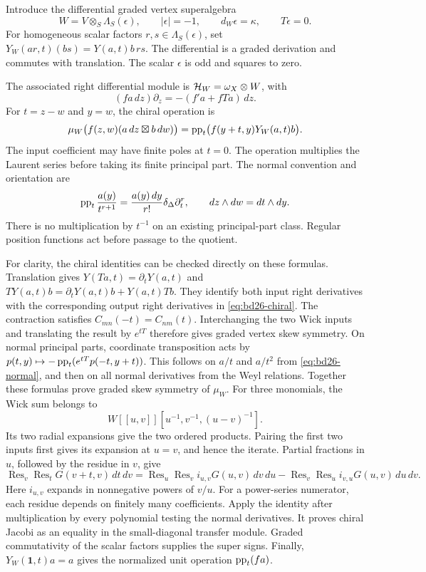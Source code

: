 Introduce the differential graded vertex superalgebra
\begin{equation}\label{eq:bd26-state}
 W=V\otimes_S\Lambda_S(\epsilon),\qquad
 |\epsilon|=-1,\qquad d_W\epsilon=\kappa,\qquad T\epsilon=0.
\end{equation}
For homogeneous scalar factors $r,s\in\Lambda_S(\epsilon)$, set
$Y_W(ar,t)(bs)=Y(a,t)b\,rs$.
The differential is a graded derivation and commutes with translation.
The scalar $\epsilon$ is odd and squares to zero.

The associated right differential module is $\mathcal H_W=\omega_X\otimes W$, with
\[
 (fa\,dz)\partial_z=-(f'a+fTa)\,dz.
\]
For $t=z-w$ and $y=w$, the chiral operation is
\begin{equation}\label{eq:bd26-chiral}
 \mu_W\bigl(f(z,w)(a\,dz\boxtimes b\,dw)\bigr)
 =\operatorname{pp}_t\bigl(f(y+t,y)Y_W(a,t)b\bigr).
\end{equation}
The input coefficient may have finite poles at $t=0$.
The operation multiplies the Laurent series before taking its finite principal part.
The normal convention and orientation are
\begin{equation}\label{eq:bd26-normal}
 \operatorname{pp}_t\frac{a(y)}{t^{r+1}}
 =\frac{a(y)\,dy}{r!}\delta_\Delta\partial_t^r,
 \qquad dz\wedge dw=dt\wedge dy.
\end{equation}
There is no multiplication by $t^{-1}$ on an existing principal-part class.
Regular position functions act before passage to the quotient.

For clarity, the chiral identities can be checked directly on these formulas.
Translation gives $Y(Ta,t)=\partial_tY(a,t)$ and
$TY(a,t)b=\partial_tY(a,t)b+Y(a,t)Tb$.
They identify both input right derivatives with the corresponding output right derivatives in \eqref{eq:bd26-chiral}.
The contraction satisfies $C_{mn}(-t)=C_{nm}(t)$.
Interchanging the two Wick inputs and translating the result by $e^{tT}$ therefore gives graded vertex skew symmetry.
On normal principal parts, coordinate transposition acts by
$p(t,y)\mapsto-\operatorname{pp}_t(e^{tT}p(-t,y+t))$.
This follows on $a/t$ and $a/t^2$ from \eqref{eq:bd26-normal}, and then on all normal derivatives from the Weyl relations.
Together these formulas prove graded skew symmetry of $\mu_W$.
For three monomials, the Wick sum belongs to
\[
 W[[u,v]][u^{-1},v^{-1},(u-v)^{-1}].
\]
Its two radial expansions give the two ordered products.
Pairing the first two inputs first gives its expansion at $u=v$, and hence the iterate.
Partial fractions in $u$, followed by the residue in $v$, give
\[
 \operatorname{Res}_v\operatorname{Res}_t G(v+t,v)\,dt\,dv
 =\operatorname{Res}_u\operatorname{Res}_v i_{u,v}G(u,v)\,dv\,du
 -\operatorname{Res}_v\operatorname{Res}_u i_{v,u}G(u,v)\,du\,dv.
\]
Here $i_{u,v}$ expands in nonnegative powers of $v/u$.
For a power-series numerator, each residue depends on finitely many coefficients.
Apply the identity after multiplication by every polynomial testing the normal derivatives.
It proves chiral Jacobi as an equality in the small-diagonal transfer module.
Graded commutativity of the scalar factors supplies the super signs.
Finally, $Y_W(\mathbf1,t)a=a$ gives the normalized unit operation $\operatorname{pp}_t(fa)$.

